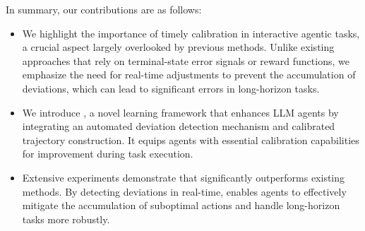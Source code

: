 In summary, our contributions are as follows:
\begin{itemize}[leftmargin=*, nolistsep]
\setlength{\itemsep}{1mm}
\item We highlight the importance of timely calibration in interactive agentic tasks, a crucial aspect largely overlooked by previous methods.
Unlike existing approaches that rely on terminal-state error signals or reward functions, we emphasize the need for real-time adjustments to prevent the accumulation of deviations, which can lead to significant errors in long-horizon tasks.
\item We introduce \model, a novel learning framework that enhances LLM agents by integrating an automated deviation detection mechanism and calibrated trajectory construction. It equips agents with essential calibration capabilities for improvement during task execution.
\item Extensive experiments demonstrate that \model significantly outperforms existing methods. By detecting deviations in real-time, \model enables agents to effectively mitigate the accumulation of suboptimal actions and handle long-horizon tasks more robustly.
\end{itemize}
